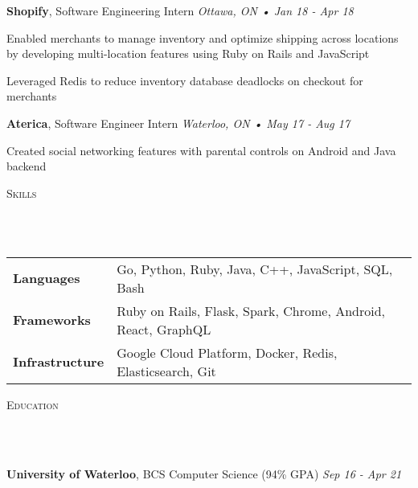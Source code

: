 \documentclass[a4paper, 12pt, hidelinks]{article}
\newcommand{\lineunder} {
    \vspace*{-8pt} \\
    \hrulefill \\
}
\newcommand{\header} [1] {
    \color{bigtext}
    {\hspace*{-4pt}\vspace*{6pt} \textsc{#1}}
    \vspace*{-6pt}
    \color{weaktext}
    \lineunder
    \vspace{6pt}
    \color{bodytext}
}
\newcommand{\jobheader} [3] {
    \color{bigtext}\textbf{#1}, {#2}
    \color{weaktext}\hfill{\small\textit{#3}}\\
    \vspace{-2mm} \color{bodytext}
}
\newcommand{\job} [5] {
    \jobheader{#1}{#2}{\small\textit{#3} • \textit{#4}}
    \begin{itemize}[leftmargin=1.8em, rightmargin=0.8em] \itemsep 1pt \color{bodytext}
        {#5}
    \end{itemize}
}
\begin{document}
\job{Shopify}{Software Engineering Intern}{Ottawa, ON}{Jan 18 - Apr 18}{
    \item Enabled merchants to manage inventory and optimize shipping across locations by developing
    multi-location features using Ruby on Rails and JavaScript
    \item Leveraged Redis to reduce inventory database deadlocks on checkout for merchants
}

\job{Aterica}{Software Engineer Intern}{Waterloo, ON}{May 17 - Aug 17}{
    \item Created social networking features with parental controls on Android and Java backend
}

\header{Skills}

\hspace{-10pt}
\begin{tabular}{ l l }
    \color{bigtext}\textbf{Languages}\color{bodytext} & Go, Python, Ruby, Java, C++, JavaScript, SQL, Bash \\[2pt]
    \color{bigtext}\textbf{Frameworks}\color{bodytext} & Ruby on Rails, Flask, Spark, Chrome, Android, React, GraphQL \\[2pt]
    \color{bigtext}\textbf{Infrastructure}\color{bodytext} & Google Cloud Platform, Docker, Redis, Elasticsearch, Git
\end{tabular}
\vspace{3mm}

\header{Education}
\jobheader{University of Waterloo}{BCS Computer Science (94\% GPA)}{Sep 16 - Apr 21}
\end{document}

